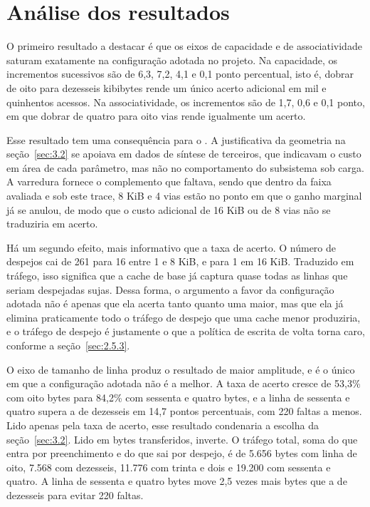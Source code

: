 \section{Análise dos resultados}\label{sec:4.6}

O primeiro resultado a destacar é que os eixos de capacidade e de associatividade saturam exatamente na configuração adotada no projeto. Na capacidade, os incrementos sucessivos são de 6,3, 7,2, 4,1 e 0,1 ponto percentual, isto é, dobrar de oito para dezesseis kibibytes rende um único acerto adicional em mil e quinhentos acessos. Na associatividade, os incrementos são de 1,7, 0,6 e 0,1 ponto, em que dobrar de quatro para oito vias rende igualmente um acerto.

Esse resultado tem uma consequência para o . A justificativa da geometria na seção~\ref{sec:3.2} se apoiava em dados de síntese de terceiros, que indicavam o custo em área de cada parâmetro, mas não no comportamento do subsistema sob carga. A varredura fornece o complemento que faltava, sendo que dentro da faixa avaliada e sob este trace, 8 KiB e 4 vias estão no ponto em que o ganho marginal já se anulou, de modo que o custo adicional de 16 KiB ou de 8 vias não se traduziria em acerto.

Há um segundo efeito, mais informativo que a taxa de acerto. O número de despejos cai de 261 para 16 entre 1 e 8 KiB, e para 1 em 16 KiB. Traduzido em tráfego, isso significa que a cache de base já captura quase todas as linhas que seriam despejadas sujas. Dessa forma, o argumento a favor da configuração adotada não é apenas que ela acerta tanto quanto uma maior, mas que ela já elimina praticamente todo o tráfego de despejo que uma cache menor produziria, e o tráfego de despejo é justamente o que a política de escrita de volta torna caro, conforme a seção~\ref{sec:2.5.3}.

O eixo de tamanho de linha produz o resultado de maior amplitude, e é o único em que a configuração adotada não é a melhor. A taxa de acerto cresce de 53,3\% com oito bytes para 84,2\% com sessenta e quatro bytes, e a linha de sessenta e quatro supera a de dezesseis em 14,7 pontos percentuais, com 220 faltas a menos. Lido apenas pela taxa de acerto, esse resultado condenaria a escolha da seção~\ref{sec:3.2}. Lido em bytes transferidos, inverte. O tráfego total, soma do que entra por preenchimento e do que sai por despejo, é de 5.656 bytes com linha de oito, 7.568 com dezesseis, 11.776 com trinta e dois e 19.200 com sessenta e quatro. A linha de sessenta e quatro bytes move 2,5 vezes mais bytes que a de dezesseis para evitar 220 faltas.

